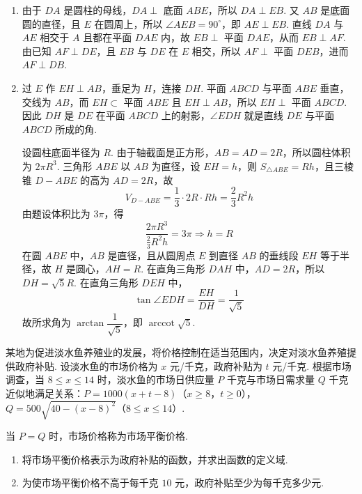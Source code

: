 \begin{solution}
\begin{enumerate}
\item 由于 \(DA\) 是圆柱的母线，\(DA\perp\) 底面 \(ABE\)，所以 \(DA\perp EB\). 又 \(AB\) 是底面圆的直径，且 \(E\) 在圆周上，所以 \(\angle AEB=90^\circ\)，即 \(AE\perp EB\). 直线 \(DA\) 与 \(AE\) 相交于 \(A\) 且都在平面 \(DAE\) 内，故 \(EB\perp\) 平面 \(DAE\)，从而 \(EB\perp AF\). 由已知 \(AF\perp DE\)，且 \(EB\) 与 \(DE\) 在 \(E\) 相交，所以 \(AF\perp\) 平面 \(DEB\)，进而 \(AF\perp DB\).

\item 过 \(E\) 作 \(EH\perp AB\)，垂足为 \(H\)，连接 \(DH\). 平面 \(ABCD\) 与平面 \(ABE\) 垂直，交线为 \(AB\)，而 \(EH\subset\) 平面 \(ABE\) 且 \(EH\perp AB\)，所以 \(EH\perp\) 平面 \(ABCD\). 因此 \(DH\) 是 \(DE\) 在平面 \(ABCD\) 上的射影，\(\angle EDH\) 就是直线 \(DE\) 与平面 \(ABCD\) 所成的角.

设圆柱底面半径为 \(R\). 由于轴截面是正方形，\(AB=AD=2R\)，所以圆柱体积为 \(2\pi R^3\). 三角形 \(ABE\) 以 \(AB\) 为直径，设 \(EH=h\)，则 \(S_{\triangle ABE}=R h\)，且三棱锥 \(D-ABE\) 的高为 \(AD=2R\)，故
\[
V_{D-ABE}=\frac13\cdot2R\cdot Rh=\frac23R^2h
\]
由题设体积比为 \(3\pi\)，得
\[
\frac{2\pi R^3}{\frac23R^2h}=3\pi\Longrightarrow h=R
\]
在圆 \(ABE\) 中，\(AB\) 是直径，且从圆周点 \(E\) 到直径 \(AB\) 的垂线段 \(EH\) 等于半径，故 \(H\) 是圆心，\(AH=R\). 在直角三角形 \(DAH\) 中，\(AD=2R\)，所以 \(DH=\sqrt5R\). 在直角三角形 \(DEH\) 中，
\[
\tan\angle EDH=\frac{EH}{DH}=\frac1{\sqrt5}
\]
故所求角为 \(\arctan\dfrac1{\sqrt5}\)，即 \(\operatorname{arccot}\sqrt5\).
\end{enumerate}
\end{solution}

\begin{problem}
某地为促进淡水鱼养殖业的发展，将价格控制在适当范围内，决定对淡水鱼养殖提供政府补贴. 设淡水鱼的市场价格为 \(x\) 元/千克，政府补贴为 \(t\) 元/千克. 根据市场调查，当 \(8 \leqslant x \leqslant 14\) 时，淡水鱼的市场日供应量 \(P\) 千克与市场日需求量 \(Q\) 千克近似地满足关系：\(P = 1000(x + t - 8)\)（\(x \geqslant 8\)，\(t \geqslant 0\)），\(Q = 500\sqrt{40 - (x - 8)^2}\)（\(8 \leqslant x \leqslant 14\)）.

当 \(P = Q\) 时，市场价格称为市场平衡价格.

\begin{enumerate}
\item 将市场平衡价格表示为政府补贴的函数，并求出函数的定义域.

\item 为使市场平衡价格不高于每千克 \(10\) 元，政府补贴至少为每千克多少元.
\end{enumerate}
\end{problem}

